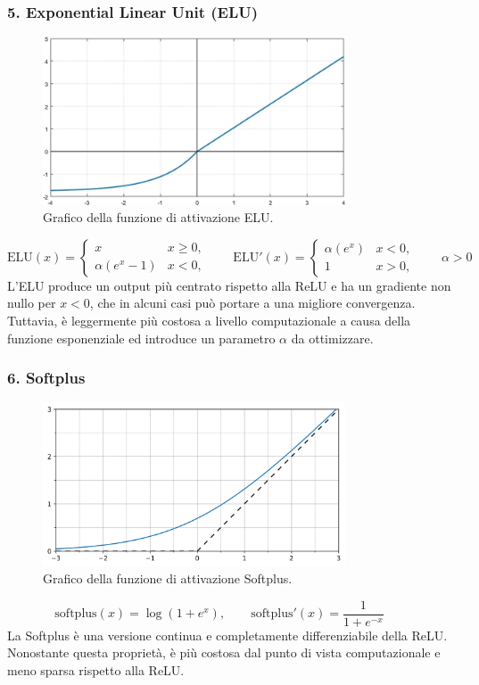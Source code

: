 \documentclass[a4paper,12pt]{report}
\begin{document}
	\subsubsection{5. Exponential Linear Unit (ELU)}
	\begin{figure}[H]
		\centering
		\includegraphics[width=0.8\textwidth]{img/elu.png}
		\caption{Grafico della funzione di attivazione ELU.}
	\end{figure}
	\[
	\mathrm{ELU}(x)=\begin{cases}x & x\ge0,\\ \alpha(e^x-1) & x<0,\end{cases}\qquad
	\mathrm{ELU}'(x)=\begin{cases}\alpha(e^x) & x<0,\\ 1 & x>0,\end{cases}\qquad \alpha>0
	\]
	L'ELU produce un output più centrato rispetto alla ReLU e ha un gradiente non nullo per $x<0$, che in alcuni casi può portare a una migliore convergenza. Tuttavia, è leggermente più costosa a livello computazionale a causa della funzione esponenziale ed introduce un parametro $\alpha$ da ottimizzare.
	
	\subsubsection{6. Softplus}
	\begin{figure}[H]
		\centering
		\includegraphics[width=0.8\textwidth]{img/softplus.png}
		\caption{Grafico della funzione di attivazione Softplus.}
	\end{figure}
	\[
	\mathrm{softplus}(x)=\log(1+e^x),\qquad
	\mathrm{softplus}'(x)=\frac{1}{1+e^{-x}}\qquad
	\]
	La Softplus è una versione continua e completamente differenziabile della ReLU. Nonostante questa proprietà, è più costosa dal punto di vista computazionale e meno sparsa rispetto alla ReLU.
	
\end{document}
